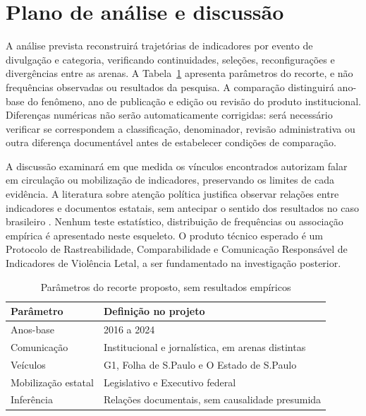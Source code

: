 \section{Plano de análise e discussão}

A análise prevista reconstruirá trajetórias de indicadores por evento de divulgação e categoria, verificando continuidades, seleções, reconfigurações e divergências entre as arenas. A Tabela~\ref{tab:parametros-recorte} apresenta parâmetros do recorte, e não frequências observadas ou resultados da pesquisa. A comparação distinguirá ano-base do fenômeno, ano de publicação e edição ou revisão do produto institucional. Diferenças numéricas não serão automaticamente corrigidas: será necessário verificar se correspondem a classificação, denominador, revisão administrativa ou outra diferença documentável antes de estabelecer condições de comparação.

A discussão examinará em que medida os vínculos encontrados autorizam falar em circulação ou mobilização de indicadores, preservando os limites de cada evidência. A literatura sobre atenção política justifica observar relações entre indicadores e documentos estatais, sem antecipar o sentido dos resultados no caso brasileiro \cite{kristensen2023indicadores}. Nenhum teste estatístico, distribuição de frequências ou associação empírica é apresentado neste esqueleto. O produto técnico esperado é um Protocolo de Rastreabilidade, Comparabilidade e Comunicação Responsável de Indicadores de Violência Letal, a ser fundamentado na investigação posterior.

\begin{table}[htb]
\caption{Parâmetros do recorte proposto, sem resultados empíricos}
\label{tab:parametros-recorte}
\centering
\begin{tabular}{p{}p{}}
\toprule
\textbf{Parâmetro} & \textbf{Definição no projeto} \\
\midrule
Anos-base & 2016 a 2024 \\
Comunicação & Institucional e jornalística, em arenas distintas \\
Veículos & G1, Folha de S.Paulo e O Estado de S.Paulo \\
Mobilização estatal & Legislativo e Executivo federal \\
Inferência & Relações documentais, sem causalidade presumida \\
\bottomrule
\end{tabular}
\end{table}
